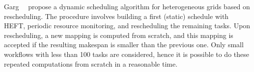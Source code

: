 \documentclass[conference]{IEEEtran}
\newcommand{\new}[1]{{\color{blue}#1}}
\begin{document}
    Garg~\etal~\cite{GARG2015256} propose a dynamic scheduling algorithm for heterogeneous grids based on rescheduling.
    The procedure involves building a first (static) schedule with HEFT, periodic resource monitoring, 
    and rescheduling the remaining tasks. 
    Upon rescheduling, a new mapping is computed from scratch, 
    and this mapping is accepted if the resulting makespan
    is smaller than the previous one.
    \new{Only small workflows with less than 100 tasks are considered, hence it is possible to do
    these repeated computations from scratch in a reasonable time. }
%

%
%
%
\end{document}

